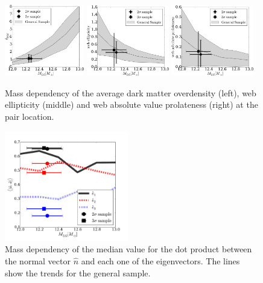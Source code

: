 \documentclass{emulateapj}
\begin{document}
\begin{figure}
\begin{center}
  \includegraphics[width=0.31\textwidth]{median_mass_overdensity.pdf} 
  \includegraphics[width=0.32\textwidth]{median_mass_ellipticity.pdf} 
  \includegraphics[width=0.32\textwidth]{median_mass_prolateness.pdf} 
\caption{Mass dependency of the average dark matter overdensity (left),
  web ellipticity (middle) and web absolute value prolateness (right) at the
  pair location.
\label{fig:median_overdensity}}
\end{center}
\end{figure}


\begin{figure}
\begin{center}
  \includegraphics[width=0.48\textwidth]{median_mass_alignment.pdf} 
\caption{Mass dependency of the median value for the dot product
  between the normal vector $\hat{n}$ and each one of the
  eigenvectors.  The lines show the trends for the general sample.
\label{fig:median_alignment_n}}
\end{center}
\end{figure}
\end{document}
